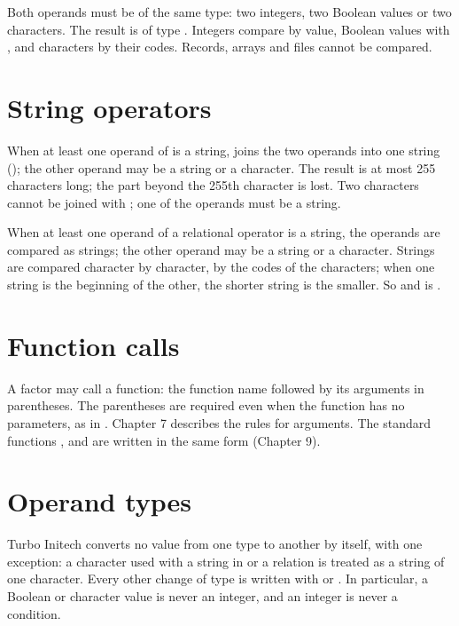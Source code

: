 Both operands must be of the same type: two integers, two Boolean values or
two characters.  The result is of type .  Integers compare by
value, Boolean values with , and characters by their
codes.  Records, arrays and files cannot be compared.



\section{String operators}
When at least one operand of \code{+} is a string, \code{+} joins the two
operands into one string (); the other operand may be a
string or a character.  The result is at most 255 characters long; the
part beyond the 255th character is lost.  Two characters cannot be joined
with \code{+}; one of the operands must be a string.

When at least one operand of a relational operator is a string, the
operands are compared as strings; the other operand may be a string or a
character.  Strings are compared character by character, by the codes of
the characters; when one string is the beginning of the other, the shorter
string is the smaller.  So  and
 is .



\section{Function calls}
A factor may call a function: the function name followed by its arguments
in parentheses.  The parentheses are required even when the function has
no parameters, as in .  Chapter 7 describes the rules for
arguments.  The standard functions ,  and
 are written in the same form (Chapter 9).

\section{Operand types}
Turbo Initech converts no value from one type to another by itself, with
one exception: a character used with a string in \code{+} or a relation
is treated as a string of one character.  Every other change of type is
written with  or .  In particular, a Boolean or
character value is never an integer, and an integer is never a condition.
